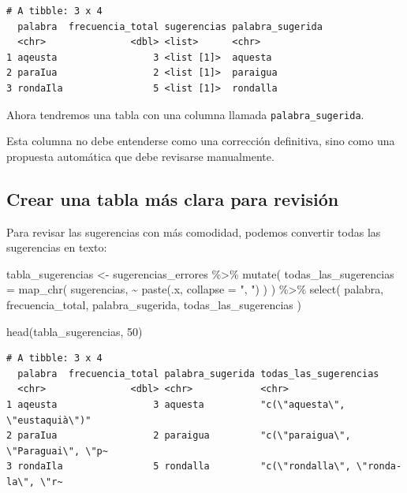 \documentclass[
  letterpaper,
  DIV=11,
  numbers=noendperiod]{scrreprt}
\newenvironment{Shaded}{\begin{snugshade}}{\end{snugshade}}
\newcommand{\AttributeTok}[1]{\textcolor[rgb]{0.40,0.45,0.13}{#1}}
\newcommand{\DecValTok}[1]{\textcolor[rgb]{0.68,0.00,0.00}{#1}}
\newcommand{\FunctionTok}[1]{\textcolor[rgb]{0.28,0.35,0.67}{#1}}
\newcommand{\NormalTok}[1]{\textcolor[rgb]{0.00,0.23,0.31}{#1}}
\newcommand{\OtherTok}[1]{\textcolor[rgb]{0.00,0.23,0.31}{#1}}
\newcommand{\SpecialCharTok}[1]{\textcolor[rgb]{0.37,0.37,0.37}{#1}}
\newcommand{\StringTok}[1]{\textcolor[rgb]{0.13,0.47,0.30}{#1}}
\begin{document}
\begin{verbatim}
# A tibble: 3 x 4
  palabra  frecuencia_total sugerencias palabra_sugerida
  <chr>               <dbl> <list>      <chr>           
1 aqeusta                 3 <list [1]>  aquesta         
2 paraIua                 2 <list [1]>  paraigua        
3 rondaIla                5 <list [1]>  rondalla        
\end{verbatim}

Ahora tendremos una tabla con una columna llamada
\texttt{palabra\_sugerida}.

Esta columna no debe entenderse como una corrección definitiva, sino
como una propuesta automática que debe revisarse manualmente.

\subsection{Crear una tabla más clara para
revisión}\label{crear-una-tabla-muxe1s-clara-para-revisiuxf3n}

Para revisar las sugerencias con más comodidad, podemos convertir todas
las sugerencias en texto:

\begin{Shaded}
\begin{Highlighting}[]
\NormalTok{tabla\_sugerencias }\OtherTok{\textless{}{-}}\NormalTok{ sugerencias\_errores }\SpecialCharTok{\%\textgreater{}\%}
  \FunctionTok{mutate}\NormalTok{(}
    \AttributeTok{todas\_las\_sugerencias =} \FunctionTok{map\_chr}\NormalTok{(}
\NormalTok{      sugerencias,}
      \SpecialCharTok{\textasciitilde{}} \FunctionTok{paste}\NormalTok{(.x, }\AttributeTok{collapse =} \StringTok{", "}\NormalTok{)}
\NormalTok{    )}
\NormalTok{  ) }\SpecialCharTok{\%\textgreater{}\%}
  \FunctionTok{select}\NormalTok{(}
\NormalTok{    palabra,}
\NormalTok{    frecuencia\_total,}
\NormalTok{    palabra\_sugerida,}
\NormalTok{    todas\_las\_sugerencias}
\NormalTok{  )}

\FunctionTok{head}\NormalTok{(tabla\_sugerencias, }\DecValTok{50}\NormalTok{)}
\end{Highlighting}
\end{Shaded}

\begin{verbatim}
# A tibble: 3 x 4
  palabra  frecuencia_total palabra_sugerida todas_las_sugerencias              
  <chr>               <dbl> <chr>            <chr>                              
1 aqeusta                 3 aquesta          "c(\"aquesta\", \"eustaquià\")"    
2 paraIua                 2 paraigua         "c(\"paraigua\", \"Paraguai\", \"p~
3 rondaIla                5 rondalla         "c(\"rondalla\", \"ronda-la\", \"r~
\end{verbatim}
\end{document}
